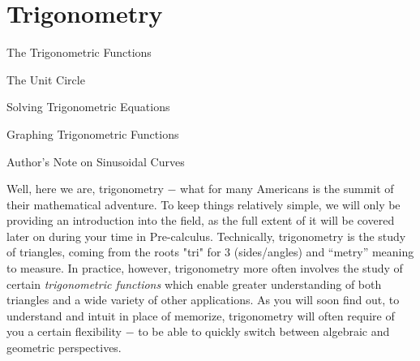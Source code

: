 \documentclass[../book.tex]{subfiles}
\begin{document}
\chapter{Trigonometry}
\begin{introduction}[Contents]
\item The Trigonometric Functions
\item The Unit Circle
\item Solving Trigonometric Equations
\item Graphing Trigonometric Functions
\item Author's Note on Sinusoidal Curves
\end{introduction}
\noindent Well, here we are, trigonometry $-$ what for many Americans is the summit of their mathematical adventure. To keep things relatively simple, we will only be providing an introduction into the field, as the full extent of it will be covered later on during your time in Pre-calculus. Technically, trigonometry is the study of triangles, coming from the roots "tri" for $3$ (sides/angles) and “metry” meaning to measure. In practice, however, trigonometry more often involves the study of certain \textit{trigonometric functions} which enable greater understanding of both triangles and a wide variety of other applications. As you will soon find out, to understand and intuit in place of memorize, trigonometry will often require of you a certain flexibility $-$ to be able to quickly switch between algebraic and geometric perspectives.  
\end{document}
